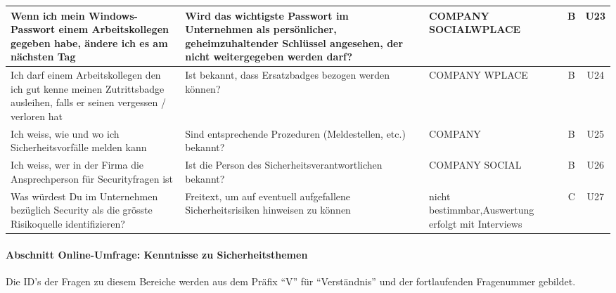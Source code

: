 \documentclass[../../main.tex]{subfiles}
\begin{document}
\begin{table}[H]
\begin{tabular}{ |p{5.5cm}|p{5.5cm}|p{2.5cm}|c|c|}
Wenn ich mein Windows-Passwort einem Arbeitskollegen gegeben habe, ändere ich es am nächsten Tag & Wird das wichtigste Passwort im Unternehmen als persönlicher, geheimzuhaltender Schlüssel angesehen, der nicht weitergegeben werden darf? & COMPANY \newline SOCIAL\newline WPLACE & B & U23 \\
\hline

Ich darf einem Arbeitskollegen den ich gut kenne meinen Zutrittsbadge ausleihen, falls er seinen vergessen / verloren hat & Ist bekannt, dass Ersatzbadges bezogen werden können? & COMPANY \newline WPLACE & B & U24 \\
\hline

Ich weiss, wie und wo ich Sicherheitsvorfälle melden kann & Sind entsprechende Prozeduren (Meldestellen, etc.) bekannt? & COMPANY & B & U25 \\
\hline

Ich weiss, wer in der Firma die Ansprechperson für Securityfragen ist & Ist die Person des Sicherheitsverantwortlichen bekannt? & COMPANY \newline SOCIAL & B & U26 \\
\hline

Was würdest Du im Unternehmen bezüglich Security als die grösste Risikoquelle identifizieren? & Freitext, um auf eventuell aufgefallene Sicherheitsrisiken hinweisen zu können & nicht bestimmbar,\newline Auswertung erfolgt mit Interviews & C & U27 \\
\hline

\end{tabular}
\end{table}



\paragraph*{Abschnitt Online-Umfrage: Kenntnisse zu Sicherheitsthemen}\mbox{}

\begin{sloppypar}
Die ID's der Fragen zu diesem Bereiche werden aus dem Präfix "`V"' für "`Verständnis"' und der fortlaufenden Fragenummer gebildet.
\end{sloppypar}


\sloppy 
\end{document}
